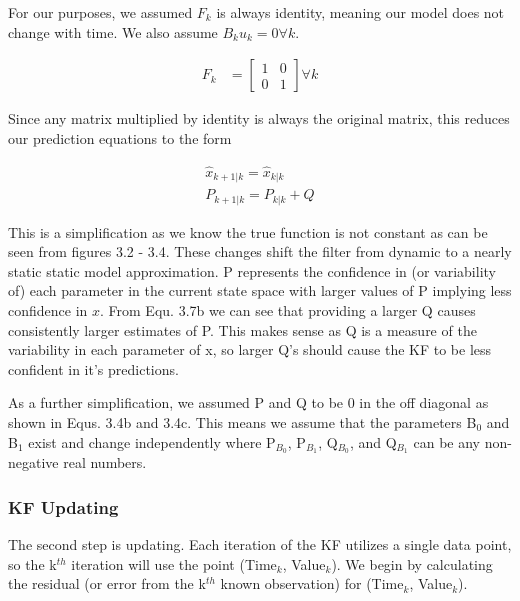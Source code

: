   For our purposes, we assumed $F_{k}$ is always identity, meaning our model does not change with time. We also assume $B_{k}u_{k} = 0 \forall k$.
  
  \begin{align}
    F_{k} &= \begin{bmatrix}
           1&0 \\
           0&1
         \end{bmatrix}
         \forall k
  \end{align}
  
  Since any matrix multiplied by identity is always the original matrix, this reduces our prediction equations to the form
  
  \begin{subequations}
  \begin{align}
  \hat{x}_{k+1|k} = \hat{x}_{k|k}   \\
  P_{k+1|k} = P_{k|k}+Q
  \end{align}
  \end{subequations}
  
  This is a simplification as we know the true function is not constant as can be seen from figures 3.2 - 3.4. These changes shift the filter from dynamic to a nearly static static model approximation. P represents the confidence in (or variability of) each parameter in the current state space with larger values of P implying less confidence in $\hat{x}$. From Equ. 3.7b we can see that providing a larger Q causes consistently larger estimates of P. This makes sense as Q is a measure of the variability in each parameter of x, so larger Q's should cause the KF to be less confident in it's predictions.
  
  As a further simplification, we assumed P and Q to be 0 in the off diagonal as shown in Equs. 3.4b and 3.4c. This means we assume that the parameters B$_{0}$ and B$_{1}$ exist and change independently where  P$_{B_{0}}$,  P$_{B_{1}}$, Q$_{B_{0}}$, and Q$_{B_{1}}$ can be any non-negative real numbers.
 
 \subsubsection{KF Updating}
 
  The second step is updating. Each iteration of the KF utilizes a single data point, so the k$^{th}$ iteration will use the point (Time$_{k}$, Value$_{k}$). We begin by calculating the residual (or error from the k$^{th}$ known observation) for (Time$_{k}$, Value$_{k}$).
  

